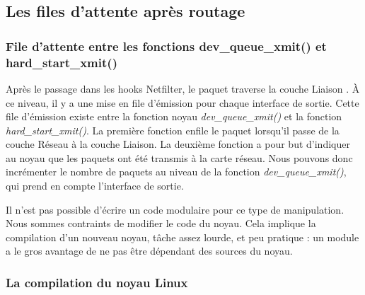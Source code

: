 \documentclass[a4paper]{article}
\begin{document}
\subsection{Les files d'attente après routage}

\subsubsection{File d'attente entre les fonctions dev\_queue\_xmit() et hard\_start\_xmit()}

Après le passage dans les hooks Netfilter, le paquet traverse la couche Liaison \cite{intel} \cite{stack}. \`A ce niveau, il y a une mise en file d’émission pour chaque interface de sortie. Cette file d’émission existe entre la fonction noyau \textit{dev\_queue\_xmit()} et la fonction \textit{hard\_start\_xmit()}. La première fonction enfile le paquet lorsqu’il passe de la couche Réseau à la couche Liaison. La deuxième fonction a pour but d’indiquer au noyau que les paquets ont été transmis à la carte réseau. Nous pouvons donc incrémenter le nombre de paquets au niveau de la fonction \textit{dev\_queue\_xmit()}, qui prend en compte l’interface de sortie.

Il n’est pas possible d’écrire un code modulaire pour ce type de manipulation.
Nous sommes contraints de modifier le code du noyau. Cela implique la compilation
d'un nouveau noyau, tâche assez lourde, et peu pratique : un module a le gros
avantage de ne pas être dépendant des sources du noyau.

\subsubsection{La compilation du noyau Linux}
\end{document}
